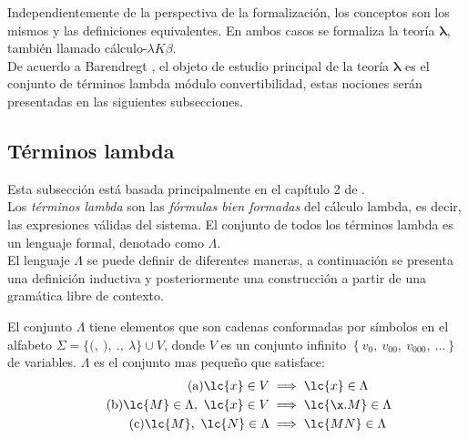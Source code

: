 Independientemente de la perspectiva de la formalización, los conceptos son los
mismos y las definiciones equivalentes. En ambos casos se formaliza la teoría
\(\boldsymbol{\lambda}\), también llamado cálculo-\(\lambda K \beta\). \\

De acuerdo a Barendregt \cite[p.~22]{Barendregt:Bible}, el objeto de estudio principal
de la teoría \(\boldsymbol{\lambda}\) es el conjunto de términos lambda módulo
convertibilidad, estas nociones serán presentadas en las siguientes
subsecciones. \\

\subsection{Términos lambda}

Esta subsección está basada principalmente en el capítulo 2 de
\cite{Barendregt:Bible}. \\

Los \emph{términos lambda} son las \emph{fórmulas bien formadas} del cálculo
lambda, es decir, las expresiones válidas del sistema. El conjunto de todos los
términos lambda es un lenguaje formal, denotado como \(\Lambda\). \\

El lenguaje \(\Lambda\) se puede definir de diferentes maneras, a continuación
se presenta una definición inductiva y posteriormente una construcción a partir
de una gramática libre de contexto. \\

\begin{defi} El conjunto \(\Lambda\) tiene elementos que son
  cadenas conformadas por símbolos en el alfabeto \(\Sigma = \{\texttt{(},\
  \texttt{)},\ \texttt{.},\ \lambda\} \cup V\), donde \(V\) es un conjunto
  infinito \(\left\{ v_{0},\ v_{00},\ v_{000},\ ... \right\}\) de variables.
  \(\Lambda\) es el conjunto mas pequeño que satisface:
  \label{definicion:terminoslambda1}
  \begin{subequations}
    \label{definicion:terminoslambda1:implicaciones}
    \begin{align}
      \label{definicion:terminoslambda1:atomos} \tag{a}
      \lc{x} \in V &\implies \lc{x} \in \Lambda
      \\
      \label{definicion:terminoslambda1:abstracciones} \tag{b}
      \lc{M} \in \Lambda,\ \lc{x} \in V &\implies \lc{\x.M} \in \Lambda
      \\
      \label{definicion:terminoslambda1:aplicaciones} \tag{c}
      \lc{M},\ \lc{N} \in \Lambda &\implies \lc{M N} \in \Lambda
    \end{align}
  \end{subequations}
\end{defi} \

